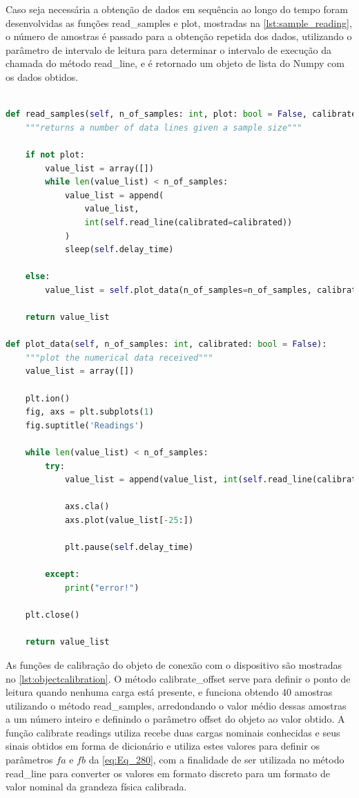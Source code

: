 Caso seja necessária a obtenção de dados em sequência ao longo do tempo foram desenvolvidas as funções read\_samples e plot, mostradas na \autoref{lst:sample_reading},
o número de amostras é passado para a obtenção repetida dos dados, utilizando o parâmetro de intervalo de leitura para determinar o intervalo de execução da chamada do
método read\_line, e é retornado um objeto de lista do Numpy com os dados obtidos.

\begin{lstlisting}[language=Python,label={lst:sample_reading},caption={{Métodos para executar experimentos do objeto NetworkDevice}}]

def read_samples(self, n_of_samples: int, plot: bool = False, calibrated: bool = False):
	"""returns a number of data lines given a sample size"""

	if not plot:
		value_list = array([])
		while len(value_list) < n_of_samples:
			value_list = append(
				value_list,
				int(self.read_line(calibrated=calibrated))
			)
			sleep(self.delay_time)

	else:
		value_list = self.plot_data(n_of_samples=n_of_samples, calibrated=calibrated)

	return value_list

def plot_data(self, n_of_samples: int, calibrated: bool = False):
	"""plot the numerical data received"""
	value_list = array([])

	plt.ion()
	fig, axs = plt.subplots(1)
	fig.suptitle('Readings')

	while len(value_list) < n_of_samples:
		try:
			value_list = append(value_list, int(self.read_line(calibrated=calibrated)))

			axs.cla()
			axs.plot(value_list[-25:])

			plt.pause(self.delay_time)

		except:
			print("error!")

	plt.close()

	return value_list

\end{lstlisting}

As funções de calibração do objeto de conexão com o dispositivo são mostradas no \autoref{lst:objectcalibration}. O método calibrate\_offset serve para definir o ponto de leitura quando
nenhuma carga está presente, e funciona obtendo 40 amostras utilizando o método read\_samples, arredondando o valor médio dessas amostras a um número inteiro e definindo o parâmetro
offset do objeto ao valor obtido. A função calibrate readings utiliza recebe duas cargas nominais conhecidas e seus sinais obtidos em forma de dicionário e utiliza estes valores para
definir os parâmetros $ fa $ e $ fb $ da \autoref{eq:Eq_280}, com a finalidade de ser utilizada no método read\_line para converter os valores em formato discreto para um formato de valor
nominal da grandeza física calibrada.

